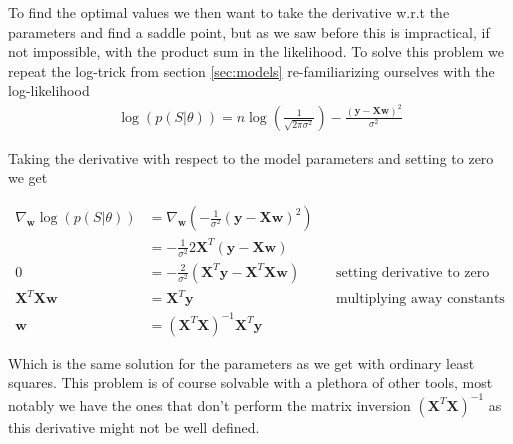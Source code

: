 \noindent To find the optimal values we then want to take the derivative w.r.t the parameters and find a saddle point, but as we saw before this is impractical, if not impossible, with the product sum in the likelihood. To solve this problem we repeat the log-trick from section \ref{sec:models} re-familiarizing ourselves with the log-likelihood
\begin{align}
\log(p(S|\theta)) = n \log(\frac{1}{\sqrt{2\pi \sigma^2}}) - \frac{(\mathbf{y} - \mathbf{X}\mathbf{w})^2}{\sigma^2}
\end{align}

\noindent Taking the derivative with respect to the model parameters and setting to zero we get

\begin{align*}
\nabla_\mathbf{w} \log(p(S|\theta)) &=\nabla_\mathbf{w}\left( - \frac{1}{\sigma^2} (\mathbf{y} - \mathbf{X}\mathbf{w})^2 \right) \\
&= -\frac{1}{\sigma^2} 2 \mathbf{X}^T(\mathbf{y}- \mathbf{X}\mathbf{w}) \\
0 & = -\frac{2}{\sigma^2}(\mathbf{X}^T\mathbf{y} - \mathbf{X}^T\mathbf{Xw})&& \text{setting derivative to zero} \\
\mathbf{X}^T\mathbf{Xw} &= \mathbf{X}^T\mathbf{y}  && \text{multiplying away constants} \\
\mathbf{w}&= (\mathbf{X}^T \mathbf{X})^{-1}\mathbf{X}^T\mathbf{y} 
\end{align*}

\noindent Which is the same solution for the parameters as we get with ordinary least squares. This problem is of course solvable with a plethora of other tools, most notably we have the ones that don't perform the matrix inversion $(\mathbf{X}^T \mathbf{X})^{-1}$ as this derivative might not be well defined. 